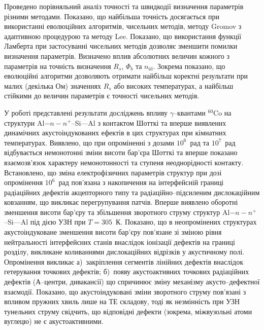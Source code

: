 Проведено порівняльний аналіз точності  та швидкодії  визначення параметрів різними методами.
Показано, що найбільша точність досягається при використанні еволюцiйних алгоритмів, чисельних методів, методу Gromov з адаптивною процедурою та методу Lee.
Показано, що використання функції Ламберта при застосуванні чисельних методів дозволяє зменшити помилки визначення параметрів.
Визначено вплив абсолютних величин кожного з параметрів на точність визначення $R_s$, $\Phi_b$ та $n_\mathrm{id}$.
Зокрема показано, що еволюційні алгоритми дозволяють отримати найбільш коректні результати при малих (декілька Ом) значеннях $R_s$ або високих температурах, а найбільш стійкими до величин параметрів є точності чисельних методів.

У  роботі представлені результати досліджень
впливу $\gamma$--квантами $^{60}$Co на структури Al$-n-n^+$--Si---Al з контактом Шотткі та
вперше виявлених динамічних акустоіндукованих ефектів в цих структурах при кімнатних температурах.
Виявлено, що при
опроміненні  з дозами $10^6$~рад та $10^7$~рад відбувається
немонотонні зміни висоти бар'єра Шотткі та вперше показано взаємозв'язок характеру немонотонності та ступеня неоднорідності контакту.
Встановлено, що зміна електрофізичних параметрів структур при дозі опромінення $10^6$~рад
пов'язана з накопичення на інтерфейсній границі радіаційних дефектів акцепторного типу та радіаційно--підсиленим дислокаційним ковзанням, що викликає перегрупування патчів.
Вперше виявлено оборотні зменшення висоти бар'єру та збільшення зворотного струму  структур Al$-n-n^+$--Si---Al під дією УЗН при $T=305$~К.
Показано, що в неопромінених структурах акустоіндуковане зменшення висоти бар'єру пов'язане зі зміною рівня нейтральності інтерфейсних станів
внаслідок іонізації дефектів на границі розділу, викликане коливаннями дислокаційних відрізків у акустичному полі.
Опромінення викликає
а)~закріплення сегментів лінійних дефектів внаслідок гетерування точкових дефектів;
б)~появу акустоактивних точкових радіаційних дефектів (А--центри, дивакансії)
що спричинює зміну механізму акусто--дефектної взаємодії.
Показано, що акустоіндуковані зміни зворотного струму пов'язані з впливом пружних хвиль лише на ТЕ складову,
тоді як незмінність при УЗН тунельних струму свідчить, що відповідні дефекти (зокрема, міжвузольні атоми вуглецю) не є акустоактивними.


